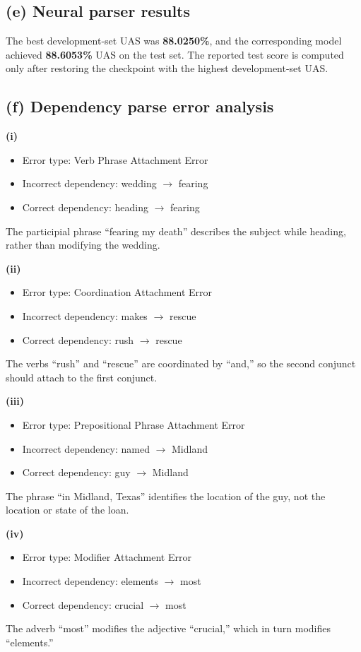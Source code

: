 \documentclass[11pt]{article}
\newcommand{\bestdev}{88.0250}
\newcommand{\testuas}{88.6053}
\begin{document}
\subsection*{(e) Neural parser results}
The best development-set UAS was \textbf{\bestdev\%}, and the corresponding model achieved \textbf{\testuas\%} UAS on the test set. The reported test score is computed only after restoring the checkpoint with the highest development-set UAS.

\subsection*{(f) Dependency parse error analysis}

\textbf{(i)}
\begin{itemize}
  \item Error type: Verb Phrase Attachment Error
  \item Incorrect dependency: wedding $\to$ fearing
  \item Correct dependency: heading $\to$ fearing
\end{itemize}
The participial phrase ``fearing my death'' describes the subject while heading, rather than modifying the wedding.

\textbf{(ii)}
\begin{itemize}
  \item Error type: Coordination Attachment Error
  \item Incorrect dependency: makes $\to$ rescue
  \item Correct dependency: rush $\to$ rescue
\end{itemize}
The verbs ``rush'' and ``rescue'' are coordinated by ``and,'' so the second conjunct should attach to the first conjunct.

\textbf{(iii)}
\begin{itemize}
  \item Error type: Prepositional Phrase Attachment Error
  \item Incorrect dependency: named $\to$ Midland
  \item Correct dependency: guy $\to$ Midland
\end{itemize}
The phrase ``in Midland, Texas'' identifies the location of the guy, not the location or state of the loan.

\textbf{(iv)}
\begin{itemize}
  \item Error type: Modifier Attachment Error
  \item Incorrect dependency: elements $\to$ most
  \item Correct dependency: crucial $\to$ most
\end{itemize}
The adverb ``most'' modifies the adjective ``crucial,'' which in turn modifies ``elements.''
\end{document}
